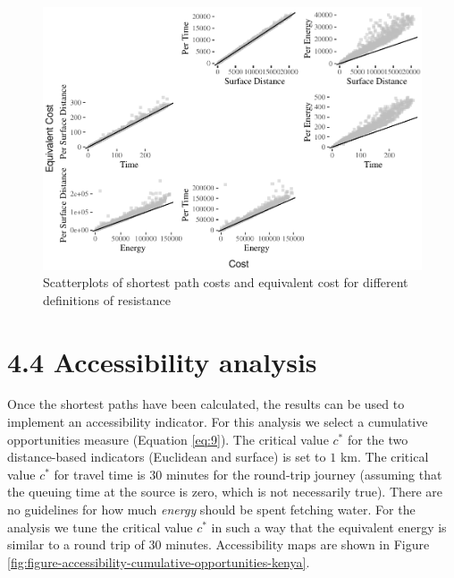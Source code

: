 \documentclass[]{elsarticle} %
\makeatletter
\def\maxwidth{\ifdim\Gin@nat@width>\linewidth\linewidth
\else\Gin@nat@width\fi}
\let\Oldincludegraphics\includegraphics
\renewcommand{\includegraphics}[1]{\Oldincludegraphics[width=\maxwidth]{#1}}
\makeatother
\begin{document}
\begin{figure}
\centering
\includegraphics{Cost-Functions-for-Walking-Accessibility_files/figure-latex/figure-scatterplots-equivalent-cost-kenya-1.pdf}
\caption{\label{fig:figure-scatterplots-equivalent-cost-kenya}Scatterplots
of shortest path costs and equivalent cost for different definitions of
resistance}
\end{figure}

\hypertarget{accessibility-analysis}{%
\section{4.4 Accessibility analysis}\label{accessibility-analysis}}

Once the shortest paths have been calculated, the results can be used to
implement an accessibility indicator. For this analysis we select a
cumulative opportunities measure (Equation \ref{eq:9}). The critical
value \(c^*\) for the two distance-based indicators (Euclidean and
surface) is set to \(1\) km. The critical value \(c^*\) for travel time
is \(30\) minutes for the round-trip journey (assuming that the queuing
time at the source is zero, which is not necessarily true). There are no
guidelines for how much \emph{energy} should be spent fetching water.
For the analysis we tune the critical value \(c^*\) in such a way that
the equivalent energy is similar to a round trip of \(30\) minutes.
Accessibility maps are shown in Figure
\ref{fig:figure-accessibility-cumulative-opportunities-kenya}.
\end{document}
